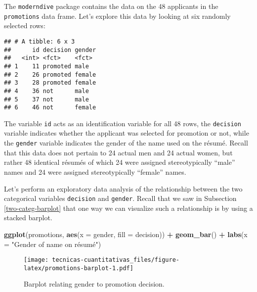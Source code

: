 \documentclass[
]{book}
\newenvironment{Shaded}{\begin{snugshade}}{\end{snugshade}}
\newcommand{\DataTypeTok}[1]{\textcolor[rgb]{0.13,0.29,0.53}{#1}}
\newcommand{\DecValTok}[1]{\textcolor[rgb]{0.00,0.00,0.81}{#1}}
\newcommand{\KeywordTok}[1]{\textcolor[rgb]{0.13,0.29,0.53}{\textbf{#1}}}
\newcommand{\NormalTok}[1]{#1}
\newcommand{\OperatorTok}[1]{\textcolor[rgb]{0.81,0.36,0.00}{\textbf{#1}}}
\newcommand{\StringTok}[1]{\textcolor[rgb]{0.31,0.60,0.02}{#1}}
\begin{document}
The \texttt{moderndive} package contains the data on the 48 applicants in the \texttt{promotions} data frame. Let's explore this data by looking at six randomly selected rows:

\begin{Shaded}
\end{Shaded}

\begin{verbatim}
## # A tibble: 6 x 3
##      id decision gender
##   <int> <fct>    <fct> 
## 1    11 promoted male  
## 2    26 promoted female
## 3    28 promoted female
## 4    36 not      male  
## 5    37 not      male  
## 6    46 not      female
\end{verbatim}

The variable \texttt{id} acts as an identification variable for all 48 rows, the \texttt{decision} variable indicates whether the applicant was selected for promotion or not, while the \texttt{gender} variable indicates the gender of the name used on the résumé. Recall that this data does not pertain to 24 actual men and 24 actual women, but rather 48 identical résumés of which 24 were assigned stereotypically ``male'' names and 24 were assigned stereotypically ``female'' names.

Let's perform an exploratory data analysis of the relationship between the two categorical variables \texttt{decision} and \texttt{gender}. Recall that we saw in Subsection \ref{two-categ-barplot} that one way we can visualize such a relationship is by using a stacked barplot.

\begin{Shaded}
\begin{Highlighting}[]
\KeywordTok{ggplot}\NormalTok{(promotions, }\KeywordTok{aes}\NormalTok{(}\DataTypeTok{x =}\NormalTok{ gender, }\DataTypeTok{fill =}\NormalTok{ decision)) }\OperatorTok{+}
\StringTok{  }\KeywordTok{geom_bar}\NormalTok{() }\OperatorTok{+}
\StringTok{  }\KeywordTok{labs}\NormalTok{(}\DataTypeTok{x =} \StringTok{"Gender of name on résumé"}\NormalTok{)}
\end{Highlighting}
\end{Shaded}

\begin{figure}
\centering
\texttt{[image: tecnicas-cuantitativas\_files/figure-latex/promotions-barplot-1.pdf]}
\caption{\label{fig:promotions-barplot}Barplot relating gender to promotion decision.}
\end{figure}
\end{document}
